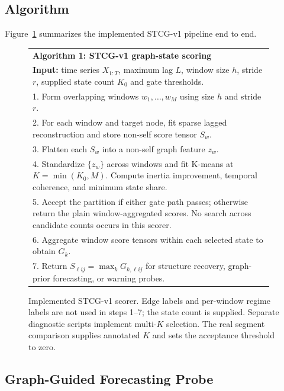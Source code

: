 \documentclass[sigconf,anonymous]{acmart}
\begin{document}
\subsection{Algorithm}

Figure~\ref{alg:stcg-v1} summarizes the implemented STCG-v1 pipeline end to end.

\begin{figure}[t]
\centering
\small
\begin{tabular}{p{0.96\linewidth}}
\toprule
\textbf{Algorithm 1: STCG-v1 graph-state scoring} \\
\textbf{Input:} time series $X_{1:T}$, maximum lag $L$, window size $h$, stride $r$, supplied state count $K_0$ and gate thresholds. \\
1. Form overlapping windows $w_1,\ldots,w_M$ using size $h$ and stride $r$. \\
2. For each window and target node, fit sparse lagged reconstruction and store non-self score tensor $S_w$. \\
3. Flatten each $S_w$ into a non-self graph feature $z_w$. \\
4. Standardize $\{z_w\}$ across windows and fit K-means at $K=\min(K_0,M)$. Compute inertia improvement, temporal coherence, and minimum state share. \\
5. Accept the partition if either gate path passes; otherwise return the plain window-aggregated scores. No search across candidate counts occurs in this scorer. \\
6. Aggregate window score tensors within each selected state to obtain $G_k$. \\
7. Return $S_{\ell i j}=\max_k G_{k,\ell i j}$ for structure recovery, graph-prior forecasting, or warning probes. \\
\bottomrule
\end{tabular}
\caption{Implemented STCG-v1 scorer. Edge labels and per-window regime labels are not used in steps 1--7; the state count is supplied. Separate diagnostic scripts implement multi-$K$ selection. The real segment comparison supplies annotated $K$ and sets the acceptance threshold to zero.}
\label{alg:stcg-v1}
\end{figure}

\subsection{Graph-Guided Forecasting Probe}
\end{document}
